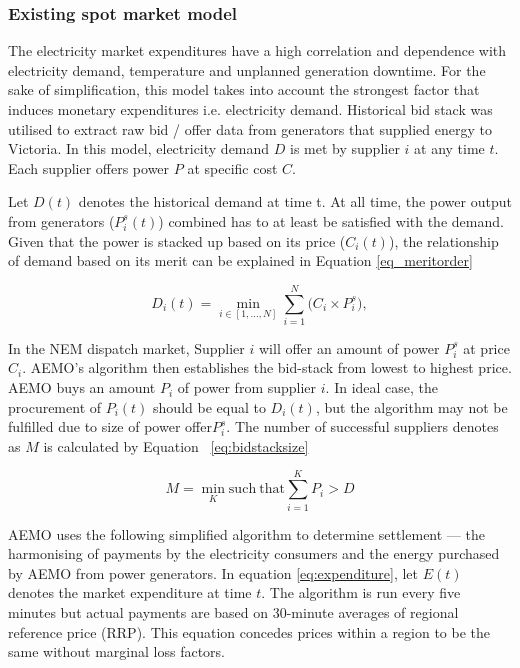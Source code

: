 \documentclass{pasa}%
\begin{document}
\subsubsection{Existing spot market model}

The electricity market expenditures have a high correlation and dependence with electricity demand, temperature and unplanned generation downtime. For the sake of simplification, this model takes into account the strongest factor that induces monetary expenditures i.e. electricity demand. Historical bid stack was utilised to extract raw bid / offer data from generators that supplied energy to Victoria. In this model, electricity demand $D$ is met by supplier $i$ at any time $t$. Each supplier offers power $P$ at specific cost $C$.

Let $D (t)$ denotes the historical demand at time t. At all time, the power output from generators ($P^s_i (t)$) combined has to at least be satisfied with the demand. Given that the power is stacked up based on its price ($C_i (t)$), the relationship of demand based on its merit can be explained in Equation \ref{eq_meritorder}


\begin{equation}\label{eq_meritorder}
D_{i} (t) = \min\limits_{i \in [1,...,N]} \sum_{i=1}^{N} \big( C_{i} \times P^s_i \big),
\end{equation}

In the NEM dispatch market, Supplier $i$ will offer an amount of power $P^s_i$ at price $C_i$. AEMO's algorithm then establishes the bid-stack from lowest to highest price.
AEMO buys an amount $P_i$ of power from supplier $i$. In ideal case, the procurement of $P_i (t)$ should be equal to $D_i (t)$, but the algorithm may not be fulfilled due to size of power offer$P^s_i$. The number of successful suppliers denotes as $M$ is calculated by Equation ~\ref{eq:bidstacksize}

\begin{equation}
  \label{eq:bidstacksize}
  M = \min_K \mathrm{such\ that} \sum_{i=1}^K P_i > D
\end{equation}


AEMO uses the following simplified algorithm to determine settlement --- the harmonising of payments by the electricity consumers and the energy purchased by AEMO from power generators. In equation \ref{eq:expenditure}, let $E (t)$ denotes the market expenditure at time $t$. The algorithm is run every five minutes but actual payments are based on 30-minute averages of regional reference price (RRP). This equation concedes prices within a region to be the same without marginal loss factors.
\end{document}

